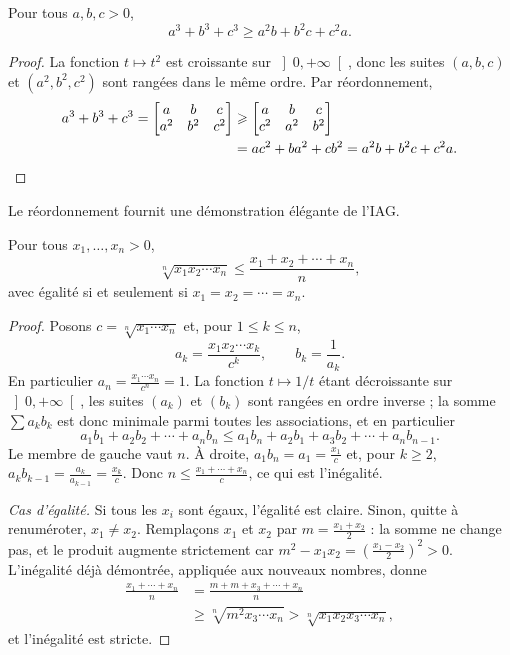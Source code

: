 \documentclass[11pt]{article}
\begin{document}
\begin{exemple}\label{exm:E15}
Pour tous $a, b, c > 0$,
\[
a^3 + b^3 + c^3 \geqslant a^2 b + b^2 c + c^2 a .
\]
\end{exemple}

\begin{proof}
La fonction $t \mapsto t^2$ est croissante sur $\left]0, +\infty\right[$,
donc les suites $(a, b, c)$ et $(a^2, b^2, c^2)$ sont rangées dans le même
ordre. Par réordonnement,
\begin{align*}
a^3 + b^3 + c^3 =
\begin{bmatrix} a & b & c \\ a^2 & b^2 & c^2 \end{bmatrix}
&\geqslant
\begin{bmatrix} a & b & c \\ c^2 & a^2 & b^2 \end{bmatrix} \\
&= ac^2 + ba^2 + cb^2 = a^2 b + b^2 c + c^2 a. \qedhere
\end{align*}
\end{proof}

Le réordonnement fournit une démonstration élégante de l'IAG.

\begin{theoreme}[IAG]\label{thm:IAG}
Pour tous $x_1, \ldots, x_n > 0$,
\[
\sqrt[n]{x_1 x_2 \cdots x_n} \leqslant \frac{x_1 + x_2 + \cdots + x_n}{n},
\]
avec égalité si et seulement si $x_1 = x_2 = \cdots = x_n$.
\end{theoreme}

\begin{proof}
Posons $c = \sqrt[n]{x_1 \cdots x_n}$ et, pour $1 \leqslant k \leqslant n$,
\[
a_k = \frac{x_1 x_2 \cdots x_k}{c^k}, \qquad b_k = \frac{1}{a_k} .
\]
En particulier $a_n = \frac{x_1 \cdots x_n}{c^n} = 1$. La fonction
$t \mapsto 1/t$ étant décroissante sur $\left]0, +\infty\right[$, les suites
$(a_k)$ et $(b_k)$ sont rangées en ordre inverse ; la somme
$\sum a_k b_k$ est donc minimale parmi toutes les associations, et en
particulier
\[
a_1 b_1 + a_2 b_2 + \cdots + a_n b_n \leqslant a_1 b_n + a_2 b_1 + a_3 b_2 + \cdots + a_n b_{n-1}.
\]
Le membre de gauche vaut $n$. À droite, $a_1 b_n = a_1 = \frac{x_1}{c}$ et,
pour $k \geqslant 2$, $a_k b_{k-1} = \frac{a_k}{a_{k-1}} = \frac{x_k}{c}$. Donc
$n \leqslant \frac{x_1 + \cdots + x_n}{c}$, ce qui est l'inégalité.

\emph{Cas d'égalité.} Si tous les $x_i$ sont égaux, l'égalité est claire.
Sinon, quitte à renuméroter, $x_1 \neq x_2$. Remplaçons $x_1$ et $x_2$ par
$m = \frac{x_1 + x_2}{2}$ : la somme ne change pas, et le produit augmente
strictement car $m^2 - x_1 x_2 = \left(\frac{x_1 - x_2}{2}\right)^2 > 0$.
L'inégalité déjà démontrée, appliquée aux nouveaux nombres, donne
\begin{align*}
\frac{x_1 + \cdots + x_n}{n} &= \frac{m + m + x_3 + \cdots + x_n}{n} \\
&\geqslant \sqrt[n]{m^2 x_3 \cdots x_n} > \sqrt[n]{x_1 x_2 x_3 \cdots x_n} ,
\end{align*}
et l'inégalité est stricte.
\end{proof}
\end{document}
